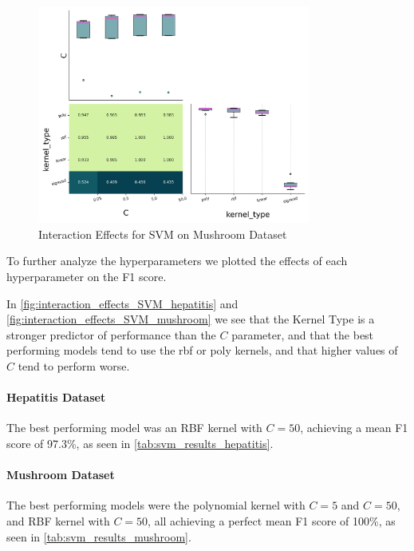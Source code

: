 \begin{figure}
    \centering
    \includegraphics[width=0.8\textwidth]{figures/interaction_effects_SVM_mushroom.png}
    \caption{Interaction Effects for SVM on Mushroom Dataset}
    \label{fig:interaction_effects_SVM_mushroom}
\end{figure}

To further analyze the hyperparameters we plotted the effects of each hyperparameter on the F1 score.

In \autoref{fig:interaction_effects_SVM_hepatitis} and \autoref{fig:interaction_effects_SVM_mushroom} we see that the Kernel Type is a stronger predictor of performance than the $C$ parameter, and that
the best performing models tend to use the rbf or poly kernels, and that higher values of $C$ tend to perform worse.

\paragraph{Hepatitis Dataset}
The best performing model was an RBF kernel with $C=50$, achieving a mean F1 score of 97.3\%, as seen in \autoref{tab:svm_results_hepatitis}.

\paragraph{Mushroom Dataset}
The best performing models were the polynomial kernel with $C=5$ and $C=50$, and RBF kernel with $C=50$, all achieving a perfect mean F1 score of 100\%, as seen in \autoref{tab:svm_results_mushroom}.
